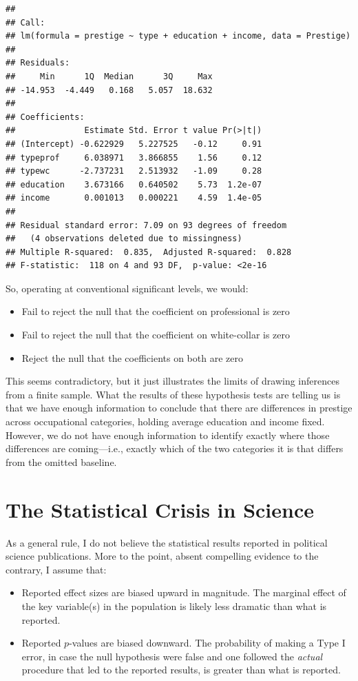 \documentclass[12pt,oneside,openany]{book}
\providecommand{\tightlist}{%
  \setlength{\itemsep}{0pt}\setlength{\parskip}{0pt}}
\begin{document}
\begin{verbatim}
## 
## Call:
## lm(formula = prestige ~ type + education + income, data = Prestige)
## 
## Residuals:
##     Min      1Q  Median      3Q     Max 
## -14.953  -4.449   0.168   5.057  18.632 
## 
## Coefficients:
##              Estimate Std. Error t value Pr(>|t|)
## (Intercept) -0.622929   5.227525   -0.12     0.91
## typeprof     6.038971   3.866855    1.56     0.12
## typewc      -2.737231   2.513932   -1.09     0.28
## education    3.673166   0.640502    5.73  1.2e-07
## income       0.001013   0.000221    4.59  1.4e-05
## 
## Residual standard error: 7.09 on 93 degrees of freedom
##   (4 observations deleted due to missingness)
## Multiple R-squared:  0.835,  Adjusted R-squared:  0.828 
## F-statistic:  118 on 4 and 93 DF,  p-value: <2e-16
\end{verbatim}

So, operating at conventional significant levels, we would:

\begin{itemize}
\tightlist
\item
  Fail to reject the null that the coefficient on professional is zero
\item
  Fail to reject the null that the coefficient on white-collar is zero
\item
  Reject the null that the coefficients on both are zero
\end{itemize}

This seems contradictory, but it just illustrates the limits of drawing
inferences from a finite sample. What the results of these hypothesis
tests are telling us is that we have enough information to conclude that
there are differences in prestige across occupational categories,
holding average education and income fixed. However, we do not have
enough information to identify exactly where those differences are
coming---i.e., exactly which of the two categories it is that differs
from the omitted baseline.

\chapter{The Statistical Crisis in Science}\label{crisis}

As a general rule, I do not believe the statistical results reported in
political science publications. More to the point, absent compelling
evidence to the contrary, I assume that:

\begin{itemize}
\item
  Reported effect sizes are biased upward in magnitude. The marginal
  effect of the key variable(s) in the population is likely less
  dramatic than what is reported.
\item
  Reported \(p\)-values are biased downward. The probability of making a
  Type I error, in case the null hypothesis were false and one followed
  the \emph{actual} procedure that led to the reported results, is
  greater than what is reported.
\end{itemize}
\end{document}
